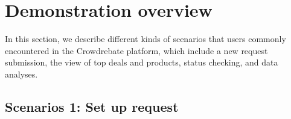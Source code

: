 \section{Demonstration overview}

In this section, we describe different kinds of scenarios that users commonly encountered in the Crowdrebate platform, which include a new request submission, the view of top deals and products, status checking, and data analyses.

\subsection{Scenarios 1: Set up request}

\begin{figure}[t!] \vspace{-2ex}
\end{figure}
